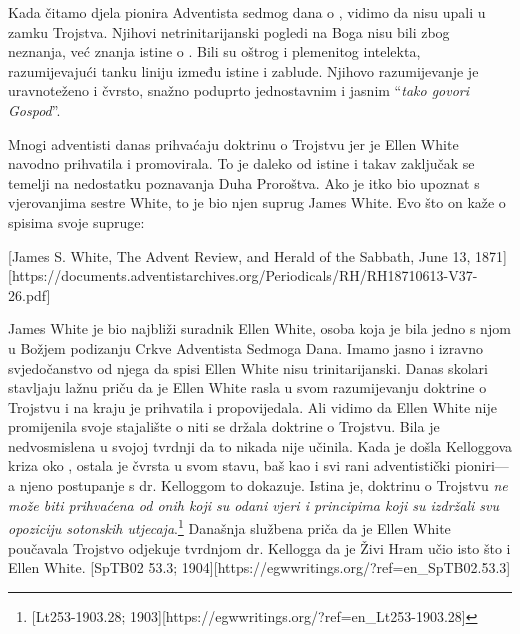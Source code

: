 Kada čitamo djela pionira Adventista sedmog dana o , vidimo da nisu upali u zamku Trojstva. Njihovi netrinitarijanski pogledi na Boga nisu bili zbog neznanja, već znanja istine o . Bili su oštrog i plemenitog intelekta, razumijevajući tanku liniju između istine i zablude. Njihovo razumijevanje  je uravnoteženo i čvrsto, snažno poduprto jednostavnim i jasnim “\textit{tako govori Gospod}”.

Mnogi adventisti danas prihvaćaju doktrinu o Trojstvu jer je Ellen White navodno prihvatila i promovirala. To je daleko od istine i takav zaključak se temelji na nedostatku poznavanja Duha Proroštva. Ako je itko bio upoznat s vjerovanjima sestre White, to je bio njen suprug James White. Evo što on kaže o spisima svoje supruge:

[James S. White, The Advent Review, and Herald of the Sabbath, June 13, 1871][https://documents.adventistarchives.org/Periodicals/RH/RH18710613-V37-26.pdf]

James White je bio najbliži suradnik Ellen White, osoba koja je bila jedno s njom u Božjem podizanju Crkve Adventista Sedmoga Dana. Imamo jasno i izravno svjedočanstvo od njega da spisi Ellen White nisu trinitarijanski. Danas skolari stavljaju lažnu priču da je Ellen White rasla u svom razumijevanju doktrine o Trojstvu i na kraju je prihvatila i propovijedala. Ali vidimo da Ellen White nije promijenila svoje stajalište o  niti se držala doktrine o Trojstvu. Bila je nedvosmislena u svojoj tvrdnji da to nikada nije učinila. Kada je došla Kelloggova kriza oko , ostala je čvrsta u svom stavu, baš kao i svi rani adventistički pioniri—a njeno postupanje s dr. Kelloggom to dokazuje. Istina je, doktrinu o Trojstvu \textit{ne može biti prihvaćena od onih koji su odani vjeri i principima koji su izdržali svu opoziciju sotonskih utjecaja}.\footnote{[Lt253-1903.28; 1903][https://egwwritings.org/?ref=en\_Lt253-1903.28]} Današnja službena priča da je Ellen White poučavala Trojstvo odjekuje tvrdnjom dr. Kellogga da je Živi Hram učio isto što i Ellen White. [SpTB02 53.3; 1904][https://egwwritings.org/?ref=en\_SpTB02.53.3]

